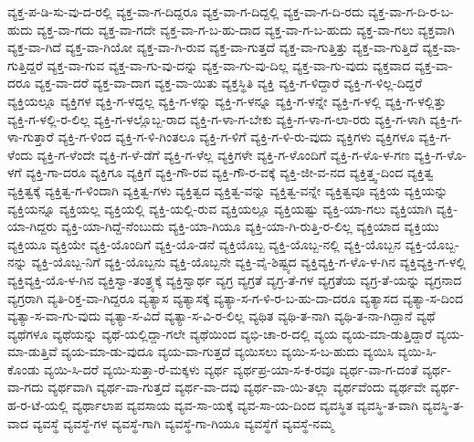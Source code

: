{ವ್ಯಕ್ತ-ಪ-ಡಿ-ಸು-ವು-ದ-ರಲ್ಲಿ
ವ್ಯಕ್ತ-ವಾ-ಗ-ದಿದ್ದರೂ
ವ್ಯಕ್ತ-ವಾ-ಗ-ದಿದ್ದಲ್ಲಿ
ವ್ಯಕ್ತ-ವಾ-ಗ-ದಿ-ರದು
ವ್ಯಕ್ತ-ವಾ-ಗ-ದಿ-ರ-ಬ-ಹುದು
ವ್ಯಕ್ತ-ವಾ-ಗದು
ವ್ಯಕ್ತ-ವಾ-ಗದೇ
ವ್ಯಕ್ತ-ವಾ-ಗ-ಬ-ಹು-ದಾದ
ವ್ಯಕ್ತ-ವಾ-ಗ-ಬ-ಹುದು
ವ್ಯಕ್ತ-ವಾ-ಗಲು
ವ್ಯಕ್ತವಾಗಿ
ವ್ಯಕ್ತ-ವಾ-ಗಿದೆ
ವ್ಯಕ್ತ-ವಾ-ಗಿಯೋ
ವ್ಯಕ್ತ-ವಾ-ಗಿ-ರುವ
ವ್ಯಕ್ತ-ವಾ-ಗುತ್ತದೆ
ವ್ಯಕ್ತ-ವಾ-ಗುತ್ತಿತ್ತು
ವ್ಯಕ್ತ-ವಾ-ಗುತ್ತಿದೆ
ವ್ಯಕ್ತ-ವಾ-ಗುತ್ತಿದ್ದರೆ
ವ್ಯಕ್ತ-ವಾ-ಗುವ
ವ್ಯಕ್ತ-ವಾ-ಗು-ವು-ದನ್ನು
ವ್ಯಕ್ತ-ವಾ-ಗು-ವು-ದಿಲ್ಲ
ವ್ಯಕ್ತ-ವಾ-ಗು-ವುದು
ವ್ಯಕ್ತವಾದ
ವ್ಯಕ್ತ-ವಾ-ದರೂ
ವ್ಯಕ್ತ-ವಾ-ದರೆ
ವ್ಯಕ್ತ-ವಾ-ದಾಗ
ವ್ಯಕ್ತ-ವಾ-ಯಿತು
ವ್ಯಕ್ತಸ್ಥಿತಿ
ವ್ಯಕ್ತಿ
ವ್ಯಕ್ತಿ-ಗ-ಳಿದ್ದಾರೆ
ವ್ಯಕ್ತಿ-ಗ-ಳಿಲ್ಲ-ದಿದ್ದರೆ
ವ್ಯಕ್ತಿಯಲ್ಲೂ
ವ್ಯಕ್ತಿಗಳ
ವ್ಯಕ್ತಿ-ಗ-ಳದ್ದಲ್ಲ
ವ್ಯಕ್ತಿ-ಗ-ಳನ್ನು
ವ್ಯಕ್ತಿ-ಗ-ಳನ್ನೂ
ವ್ಯಕ್ತಿ-ಗ-ಳನ್ನೇ
ವ್ಯಕ್ತಿ-ಗ-ಳಲ್ಲಿ
ವ್ಯಕ್ತಿ-ಗ-ಳಲ್ಲಿತ್ತು
ವ್ಯಕ್ತಿ-ಗ-ಳಲ್ಲಿ-ರ-ಲಿಲ್ಲ
ವ್ಯಕ್ತಿ-ಗ-ಳಲ್ಲೊಬ್ಬ-ರಾದ
ವ್ಯಕ್ತಿ-ಗ-ಳಾ-ಗ-ಬೇಕು
ವ್ಯಕ್ತಿ-ಗ-ಳಾ-ಗ-ಲಾ-ರರು
ವ್ಯಕ್ತಿ-ಗ-ಳಾಗಿ
ವ್ಯಕ್ತಿ-ಗ-ಳಾ-ಗುತ್ತಾರೆ
ವ್ಯಕ್ತಿ-ಗ-ಳಿಂದ
ವ್ಯಕ್ತಿ-ಗ-ಳಿ-ಗಿಂತಲೂ
ವ್ಯಕ್ತಿ-ಗ-ಳಿಗೆ
ವ್ಯಕ್ತಿ-ಗ-ಳಿ-ರು-ವುದು
ವ್ಯಕ್ತಿಗಳು
ವ್ಯಕ್ತಿಗಳೂ
ವ್ಯಕ್ತಿ-ಗ-ಳೆಂದು
ವ್ಯಕ್ತಿ-ಗ-ಳೆಂದೇ
ವ್ಯಕ್ತಿ-ಗ-ಳೆ-ಡೆಗೆ
ವ್ಯಕ್ತಿ-ಗ-ಳೆಲ್ಲ
ವ್ಯಕ್ತಿಗಳೇ
ವ್ಯಕ್ತಿ-ಗ-ಳೊಂದಿಗೆ
ವ್ಯಕ್ತಿ-ಗ-ಳೊ-ಳ-ಗಣ
ವ್ಯಕ್ತಿ-ಗ-ಳೊ-ಳಗೆ
ವ್ಯಕ್ತಿ-ಗಾ-ದರೂ
ವ್ಯಕ್ತಿಗೂ
ವ್ಯಕ್ತಿಗೆ
ವ್ಯಕ್ತಿ-ಗೌ-ರವ
ವ್ಯಕ್ತಿ-ಗೌ-ರ-ವಕ್ಕೆ
ವ್ಯಕ್ತಿ-ಜೀ-ವ-ನದ
ವ್ಯಕ್ತಿತ್ತ್ವ-ದಿಂದ
ವ್ಯಕ್ತಿತ್ವ
ವ್ಯಕ್ತಿತ್ವಕ್ಕೆ
ವ್ಯಕ್ತಿತ್ವ-ಗ-ಳಿಂದಾಗಿ
ವ್ಯಕ್ತಿತ್ವ-ಗಳು
ವ್ಯಕ್ತಿತ್ವದ
ವ್ಯಕ್ತಿತ್ವ-ವನ್ನು
ವ್ಯಕ್ತಿತ್ವ-ವನ್ನೇ
ವ್ಯಕ್ತಿತ್ವವೂ
ವ್ಯಕ್ತಿಯ
ವ್ಯಕ್ತಿಯನ್ನು
ವ್ಯಕ್ತಿಯನ್ನೂ
ವ್ಯಕ್ತಿಯಲ್ಲ
ವ್ಯಕ್ತಿಯಲ್ಲಿ
ವ್ಯಕ್ತಿ-ಯಲ್ಲಿ-ರುವ
ವ್ಯಕ್ತಿಯಲ್ಲೂ
ವ್ಯಕ್ತಿಯಷ್ಟು
ವ್ಯಕ್ತಿ-ಯಾ-ಗಲು
ವ್ಯಕ್ತಿಯಾಗಿ
ವ್ಯಕ್ತಿ-ಯಾ-ಗಿದ್ದರು
ವ್ಯಕ್ತಿ-ಯಾ-ಗಿದ್ದೆ-ನೆಂಬುದು
ವ್ಯಕ್ತಿ-ಯಾ-ಗಿಯೂ
ವ್ಯಕ್ತಿ-ಯಾ-ಗಿ-ರುತ್ತಿ-ರ-ಲಿಲ್ಲ
ವ್ಯಕ್ತಿಯಾದ
ವ್ಯಕ್ತಿಯು
ವ್ಯಕ್ತಿಯೂ
ವ್ಯಕ್ತಿಯೇ
ವ್ಯಕ್ತಿ-ಯೊಂದಿಗೆ
ವ್ಯಕ್ತಿ-ಯೊ-ಡನೆ
ವ್ಯಕ್ತಿಯೊಬ್ಬ
ವ್ಯಕ್ತಿ-ಯೊಬ್ಬ-ನಲ್ಲಿ
ವ್ಯಕ್ತಿ-ಯೊಬ್ಬನ
ವ್ಯಕ್ತಿ-ಯೊಬ್ಬ-ನನ್ನು
ವ್ಯಕ್ತಿ-ಯೊಬ್ಬ-ನಿಗೆ
ವ್ಯಕ್ತಿ-ಯೊಬ್ಬನು
ವ್ಯಕ್ತಿ-ಯೊಬ್ಬನೇ
ವ್ಯಕ್ತಿ-ವೈ-ಶಿಷ್ಟ್ಯದ
ವ್ಯಕ್ತಿವ್ಯಕ್ತಿ-ಗ-ಳೊ-ಳ-ಗಿನ
ವ್ಯಕ್ತಿವ್ಯಕ್ತಿ-ಗ-ಳಲ್ಲಿ
ವ್ಯಕ್ತಿವ್ಯಕ್ತಿ-ಯೊ-ಳ-ಗಿನ
ವ್ಯಕ್ತಿಸ್ವಾ-ತಂತ್ರ್ಯಕ್ಕೆ
ವ್ಯಕ್ತಿಸ್ವಾರ್ಥ
ವ್ಯಗ್ರ
ವ್ಯಗ್ರತೆ
ವ್ಯಗ್ರ-ತೆ-ಗಳ
ವ್ಯಗ್ರತೆಯ
ವ್ಯಗ್ರ-ತೆ-ಯನ್ನು
ವ್ಯಗ್ರನಾದ
ವ್ಯಗ್ರರಾಗಿ
ವ್ಯತಿ-ರಿಕ್ತ-ವಾ-ಗಿದ್ದರೂ
ವ್ಯತ್ಯಾಸ
ವ್ಯತ್ಯಾಸಕ್ಕೆ
ವ್ಯತ್ಯಾ-ಸ-ಗ-ಳಿ-ರ-ಬ-ಹು-ದಾ-ದರೂ
ವ್ಯತ್ಯಾಸದ
ವ್ಯತ್ಯಾ-ಸ-ದಿಂದ
ವ್ಯತ್ಯಾ-ಸ-ವಾ-ಗು-ವುದು
ವ್ಯತ್ಯಾ-ಸ-ವಿದೆ
ವ್ಯತ್ಯಾ-ಸ-ವಿ-ರ-ಲಿಲ್ಲ
ವ್ಯಥಿತ
ವ್ಯಥಿ-ತ-ನಾಗಿ
ವ್ಯಥಿ-ತ-ನಾ-ಗಿದ್ದಾನೆ
ವ್ಯಥೆ
ವ್ಯಥೆಗಳೂ
ವ್ಯಥೆಯನ್ನು
ವ್ಯಥೆ-ಯಲ್ಲಿದ್ದಾ-ಗಲೇ
ವ್ಯಥೆಯಿಂದ
ವ್ಯಭಿ-ಚಾ-ರ-ದಲ್ಲಿ
ವ್ಯಯ
ವ್ಯಯ-ಮಾ-ಡುತ್ತಿದ್ದಾರೆ
ವ್ಯಯ-ಮಾ-ಡುತ್ತಿವೆ
ವ್ಯಯ-ಮಾ-ಡು-ವುದೂ
ವ್ಯಯ-ವಾ-ಗುತ್ತದೆ
ವ್ಯಯಿಸಲು
ವ್ಯಯಿ-ಸ-ಬ-ಹುದು
ವ್ಯಯಿಸಿ
ವ್ಯಯಿ-ಸಿ-ಕೊಂಡು
ವ್ಯಯಿ-ಸಿ-ದರೆ
ವ್ಯಯಿ-ಸುತ್ತಾ-ರೆ-ಮಕ್ಕಳು
ವ್ಯರ್ಥ
ವ್ಯರ್ಥಪ್ರ-ಯಾ-ಸ-ಕ-ರವೂ
ವ್ಯರ್ಥ-ವಾ-ಗ-ದಂತೆ
ವ್ಯರ್ಥ-ವಾ-ಗದು
ವ್ಯರ್ಥವಾಗಿ
ವ್ಯರ್ಥ-ವಾ-ಗುತ್ತದೆ
ವ್ಯರ್ಥ-ವಾ-ದವು
ವ್ಯರ್ಥ-ವಾ-ಯಿ-ತಲ್ಲಾ
ವ್ಯರ್ಥವೆಂದು
ವ್ಯರ್ಥವೇ
ವ್ಯರ್ಥ-ಹ-ರ-ಟೆ-ಯಲ್ಲಿ
ವ್ಯರ್ಥಾಲಾಪ
ವ್ಯವಸಾಯ
ವ್ಯವ-ಸಾ-ಯಕ್ಕೆ
ವ್ಯವ-ಸಾ-ಯ-ದಿಂದ
ವ್ಯವಸ್ಥಿತ
ವ್ಯವಸ್ಥಿ-ತ-ವಾಗಿ
ವ್ಯವಸ್ಥಿ-ತ-ವಾದ
ವ್ಯವಸ್ಥೆ
ವ್ಯವಸ್ಥೆ-ಗಳ
ವ್ಯವಸ್ಥೆ-ಗಾಗಿ
ವ್ಯವಸ್ಥೆ-ಗಾ-ಗಿಯೂ
ವ್ಯವಸ್ಥೆಗೆ
ವ್ಯವಸ್ಥೆ-ನಮ್ಮ
}
